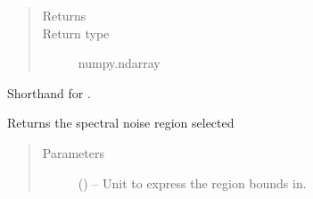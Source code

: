 \documentclass[letterpaper,10pt,english]{sphinxmanual}
\begin{document}
\begin{fulllineitems}
\begin{fulllineitems}
\begin{quote}
\begin{description}
\item[{Returns}] \leavevmode
\sphinxAtStartPar
{}

\item[{Return type}] \leavevmode
\sphinxAtStartPar
numpy.ndarray

\end{description}\end{quote}

\end{fulllineitems}


\begin{fulllineitems}
\label{\detokenize{references/freqfilter:nmrespy.freqfilter.FrequencyFilter.get_fs}}
\sphinxAtStartPar
Shorthand for {\hyperref[\detokenize{references/freqfilter:nmrespy.freqfilter.FrequencyFilter.get_filtered_spectrum}]{}}.

\end{fulllineitems}


\begin{fulllineitems}
\label{\detokenize{references/freqfilter:nmrespy.freqfilter.FrequencyFilter.get_noise_region}}
\sphinxAtStartPar
Returns the spectral noise region selected
\begin{quote}\begin{description}
\item[{Parameters}] \leavevmode
\sphinxAtStartPar
{} (\sphinxstyleliteralemphasis{\sphinxupquote{, }}\sphinxstyleliteralemphasis{\sphinxupquote{, }}\sphinxstyleliteralemphasis{\sphinxupquote{, }}) – Unit to express the region bounds in.


\end{description}
\end{quote}
\end{fulllineitems}
\end{fulllineitems}
\end{document}

